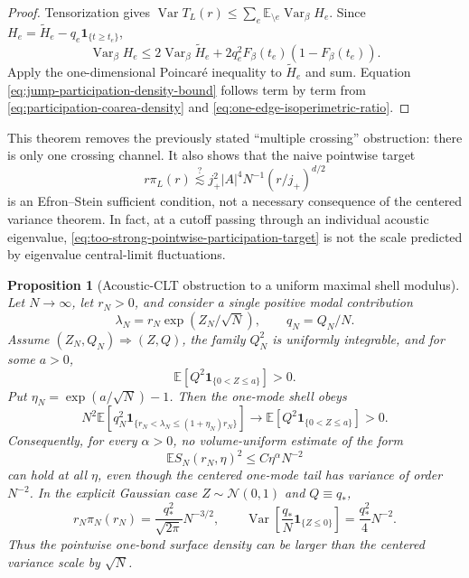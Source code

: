 \documentclass[11pt]{article}
\newtheorem{proposition}[theorem]{Proposition}
\theoremstyle{definition}
\theoremstyle{remark}
\newcommand{\E}{\mathbb E}
\newcommand{\Var}{\operatorname{Var}}
\newcommand{\abs}[1]{\left\lvert #1\right\rvert}
\begin{document}
\begin{proof}
Tensorization gives
$\Var T_L(r)\le\sum_e\E_{\setminus e}\Var_\beta H_e$.
Since
$H_e=\widetilde H_e-q_e\bm1_{\{t\ge t_e\}}$,
\[
 \Var_\beta H_e
 \le2\Var_\beta\widetilde H_e
 +2q_e^2F_\beta(t_e)(1-F_\beta(t_e)).
\]
Apply the one-dimensional Poincar\'e inequality to $\widetilde H_e$ and sum.
Equation \eqref{eq:jump-participation-density-bound} follows term by term from
\eqref{eq:participation-coarea-density} and
\eqref{eq:one-edge-isoperimetric-ratio}.
\end{proof}

This theorem removes the previously stated ``multiple crossing'' obstruction:
there is only one crossing channel.  It also shows that the naive pointwise
target
\begin{equation}
 r\pi_L(r)\stackrel{?}{\lesssim}
 j_+^2\abs A^4N^{-1}(r/j_+)^{d/2}
 \label{eq:too-strong-pointwise-participation-target}
\end{equation}
is an Efron--Stein sufficient condition, not a necessary consequence of the
centered variance theorem.  In fact, at a cutoff passing through an individual
acoustic eigenvalue, \eqref{eq:too-strong-pointwise-participation-target} is
not the scale predicted by eigenvalue central-limit fluctuations.

\begin{proposition}[Acoustic-CLT obstruction to a uniform maximal shell modulus]
\label{prop:acoustic-CLT-maximal-obstruction}
Let $N\to\infty$, let $r_N>0$, and consider a single positive modal
contribution
\begin{equation}
 \lambda_N=r_N\exp(Z_N/\sqrt N),
 \qquad q_N=Q_N/N.
 \label{eq:acoustic-one-mode-scaling}
\end{equation}
Assume $(Z_N,Q_N)\Rightarrow(Z,Q)$, the family $Q_N^2$ is uniformly
integrable, and for some $a>0$,
\begin{equation}
 \E\left[Q^2\bm1_{\{0<Z\le a\}}\right]>0.
 \label{eq:nondegenerate-acoustic-crossing}
\end{equation}
Put $\eta_N=\exp(a/\sqrt N)-1$.  Then the one-mode shell obeys
\begin{equation}
 N^2\E\left[q_N^2
 \bm1_{\{r_N<\lambda_N\le(1+\eta_N)r_N\}}\right]
 \longrightarrow
 \E\left[Q^2\bm1_{\{0<Z\le a\}}\right]>0.
 \label{eq:acoustic-shell-nonvanishing}
\end{equation}
Consequently, for every $\alpha>0$, no volume-uniform estimate of the form
\begin{equation}
 \E S_N(r_N,\eta)^2\le C\eta^\alpha N^{-2}
 \label{eq:false-uniform-Holder-shell}
\end{equation}
can hold at all $\eta$, even though the centered one-mode tail has variance
of order $N^{-2}$.  In the explicit Gaussian case
$Z\sim\mathcal N(0,1)$ and $Q\equiv q_*$,
\begin{equation}
 r_N\pi_N(r_N)=\frac{q_*^2}{\sqrt{2\pi}}N^{-3/2},
 \qquad
 \Var\left[\frac{q_*}{N}\bm1_{\{Z\le0\}}\right]
 =\frac{q_*^2}{4}N^{-2}.
 \label{eq:Gaussian-acoustic-density-versus-variance}
\end{equation}
Thus the pointwise one-bond surface density can be larger than the centered
variance scale by $\sqrt N$.
\end{proposition}
\end{document}
